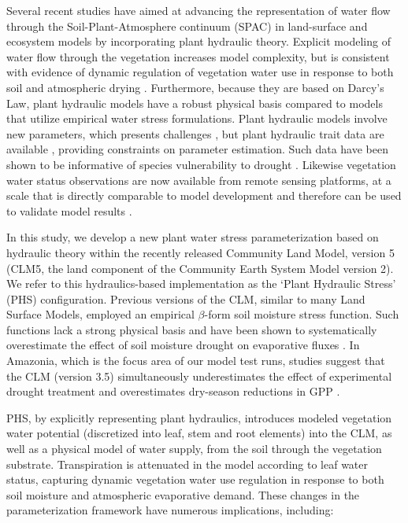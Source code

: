 \documentclass[draft,linenumbers]{agujournal}
\begin{document}
Several recent studies have aimed at advancing the representation of water flow through the Soil-Plant-Atmosphere continuum (SPAC) in land-surface and ecosystem models \citep{xu2016,christoffersen2016,sperry2017} by incorporating plant hydraulic theory.  
Explicit modeling of water flow through the vegetation increases model complexity, but is consistent with evidence of dynamic regulation of vegetation water use in response to both soil and atmospheric drying \citep{tardieu1998,sperry1998,sperry2015}.
Furthermore, because they are based on Darcy's Law, plant hydraulic models have a robust physical basis compared to models that utilize empirical water stress formulations.
Plant hydraulic models involve new parameters, which presents challenges \citep{drake2017}, but plant hydraulic trait data are available \citep{kattge2011,anderegg2015a}, providing constraints on parameter estimation.   
Such data have been shown to be informative of species vulnerability to drought \citep{choat2012}.
Likewise vegetation water status observations are now available from remote sensing platforms, at a scale that is directly comparable to model development \citep{konings2016,grant2016} and therefore can be used to validate model results \citep{momen2017,konings2017b}.

In this study, we develop a new plant water stress parameterization based on hydraulic theory within the recently released Community Land Model, version 5 (CLM5, the land component of the Community Earth System Model version 2). 
We refer to this hydraulics-based implementation as the `Plant Hydraulic Stress' (PHS) configuration. 
Previous versions of the CLM, similar to many Land Surface Models, employed an empirical $\beta$-form soil moisture stress function.
Such functions lack a strong physical basis and have been shown to systematically overestimate the effect of soil moisture drought on evaporative fluxes \citep{ukkola2016,bonan2014}.
In Amazonia, which is the focus area of our model test runs, studies suggest that the CLM (version 3.5) simultaneously underestimates the effect of experimental drought treatment \citep{powell2013} and overestimates dry-season reductions in GPP \citep{restrepo2017}.

PHS, by explicitly representing plant hydraulics, introduces modeled vegetation water potential (discretized into leaf, stem and root elements) into the CLM, as well as a physical model of water supply, from the soil through the vegetation substrate. 
Transpiration is attenuated in the model according to leaf water status, capturing dynamic vegetation water use regulation in response to both soil moisture and atmospheric evaporative demand. 
These changes in the parameterization framework have numerous implications, including: 
\end{document}
